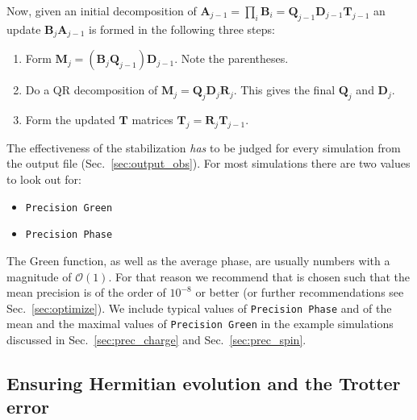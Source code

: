 Now, given an initial decomposition of $\bm{A}_{j-1} = \prod_i \mathcal{\bm{B}}_i = \bm{Q}_{j-1} \bm{D}_{j-1} \bm{T}_{j-1}$ an update
$\mathcal{\bm{B}}_j \bm{A}_{j-1}$ is formed in the following three steps:
\begin{enumerate}
\item Form $ \bm{M}_j = (\mathcal{\bm{B}}_j \bm{Q}_{j-1}) \bm{D}_{j-1}$. Note the parentheses.
\item Do a QR decomposition of $\bm{M}_j = \bm{Q}_j \bm{D}_j \bm{R}_j$. This gives the final $\bm{Q}_j$ and $\bm{D}_j$.
\item Form the updated $\bm{T}$ matrices $\bm{T}_j = \bm{R}_j \bm{T}_{j-1}$.
\end{enumerate}
The effectiveness of the stabilization \emph{has} to be judged for every simulation from the output file  (Sec.~\ref{sec:output_obs}). For most simulations there are two values to look out for:
\begin{itemize}
\item \texttt{Precision Green}
\item \texttt{Precision Phase}
\end{itemize}
The Green function, as well as the average phase, are usually numbers with a magnitude of $\mathcal{O} (1)$. 
For that reason we recommend that  is chosen such that the mean precision is of the order of $10^{-8}$ or better (or further recommendations see Sec.~\ref{sec:optimize}).
We include typical values of \texttt{Precision Phase} and of the mean and the maximal values of \texttt{Precision Green} in the example simulations discussed in Sec.~\ref{sec:prec_charge} and Sec.~\ref{sec:prec_spin}.


\subsection{Ensuring Hermitian evolution and the Trotter error}\label{sec:hermitian}
%

